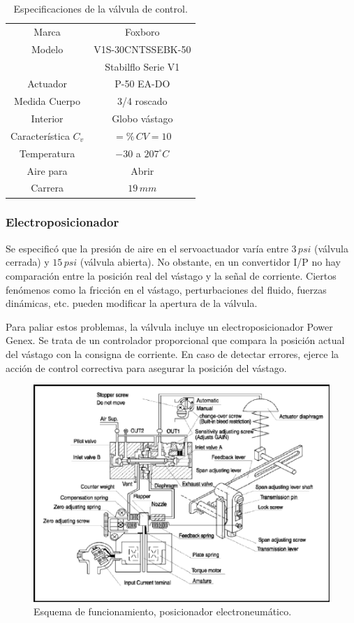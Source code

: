 \begin{table}[ht]
\renewcommand{\arraystretch}{1.3}
\centering
 \begin{tabular}{|c|c|}
  \hline
  Marca & Foxboro\\
  Modelo & V1S-30CNTSSEBK-50\\
	& Stabilflo Serie V1\\
 Actuador & P-50 EA-DO\\
 Medida Cuerpo & 3/4 roscado\\
 Interior & Globo vástago\\
 Característica $C_v$ & $=\%\,CV=10$\\
 Temperatura & $-30$ a $207^\circ C$\\
 Aire para & Abrir  \\
 Carrera & $19\,mm$ \\
  \hline
 \end{tabular}
 \caption{Especificaciones de la válvula de control.}
 \label{tab:especifValvs}
\end{table}

\subsubsection{Electroposicionador}
Se especificó que la presión de aire en el servoactuador varía entre $3\,psi$
(válvula cerrada) y $15\,psi$ (válvula abierta).
No obstante, en un convertidor I/P no hay comparación entre
la posición real del vástago y la señal de corriente.
Ciertos fenómenos como la fricción en el vástago, perturbaciones del fluido,
fuerzas dinámicas, etc. pueden modificar la apertura de la válvula.

Para paliar estos problemas, la válvula incluye un electroposicionador Power
Genex.
Se trata de un controlador proporcional que compara la posición actual del
vástago con la consigna de corriente.
En caso de detectar errores, ejerce la acción de control correctiva para
asegurar la posición del vástago.

\begin{figure}[t]
 \centering
 \includegraphics[scale=1.1]{Cap2-DisenoEnsamblado/images/PG-EPL.pdf}
 \caption{Esquema de funcionamiento, posicionador electroneumático.}
 \label{fig:elp-funcionamiento}
\end{figure}

